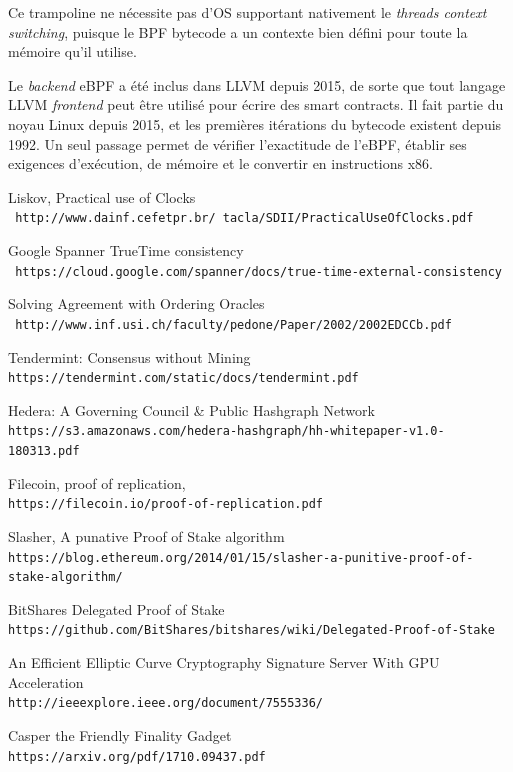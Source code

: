 \documentclass[12pt]{article}
\begin{document}
Ce trampoline ne nécessite pas d’OS supportant nativement le \textit{threads context switching}, puisque le BPF bytecode a un contexte bien défini pour toute la mémoire qu'il utilise.

Le \textit{backend} eBPF a été inclus dans LLVM depuis 2015, de sorte que tout langage LLVM \textit{frontend} peut être utilisé pour écrire des smart contracts. Il fait partie du noyau Linux depuis 2015, et les premières itérations du bytecode existent depuis 1992. Un seul passage permet de vérifier l'exactitude de l'eBPF, établir ses exigences d'exécution, de mémoire et le convertir en instructions x86.




\begin{thebibliography}{9}
Liskov, Practical use of Clocks
\\\texttt{ http://www.dainf.cefetpr.br/~tacla/SDII/PracticalUseOfClocks.pdf}

Google Spanner TrueTime consistency
\\\texttt{ https://cloud.google.com/spanner/docs/true-time-external-consistency}

Solving Agreement with Ordering Oracles
\\\texttt{ http://www.inf.usi.ch/faculty/pedone/Paper/2002/2002EDCCb.pdf}

Tendermint: Consensus without Mining
\\\texttt{https://tendermint.com/static/docs/tendermint.pdf}

Hedera: A Governing Council \& Public Hashgraph Network
\\\texttt{https://s3.amazonaws.com/hedera-hashgraph/hh-whitepaper-v1.0-180313.pdf}

Filecoin, proof of replication,
\\\texttt{https://filecoin.io/proof-of-replication.pdf}

Slasher, A punative Proof of Stake algorithm
\\\texttt{https://blog.ethereum.org/2014/01/15/slasher-a-punitive-proof-of-stake-algorithm/}

BitShares Delegated Proof of Stake
\\\texttt{https://github.com/BitShares/bitshares/wiki/Delegated-Proof-of-Stake}

An Efficient Elliptic Curve Cryptography Signature Server With GPU Acceleration
\\\texttt{http://ieeexplore.ieee.org/document/7555336/}

Casper the Friendly Finality Gadget
\\\texttt{https://arxiv.org/pdf/1710.09437.pdf}
\end{thebibliography}
\end{document}

